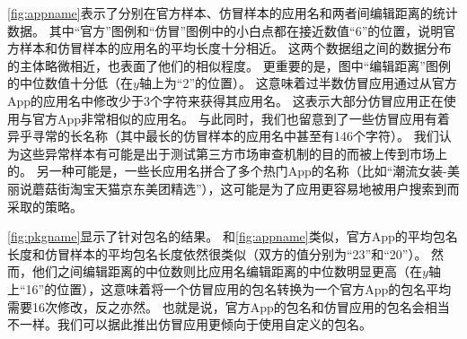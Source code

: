 \autoref{fig:appname}表示了分别在官方样本、仿冒样本的应用名和两者间编辑距离的统计数据。
其中``官方''图例和``仿冒''图例中的小白点都在接近数值``6''的位置，说明官方样本和仿冒样本的应用名的平均长度十分相近。
这两个数据组之间的数据分布的主体略微相近，也表面了他们的相似程度。
更重要的是，图中``编辑距离''图例的中位数值十分低（在$y$轴上为``2''的位置）。
这意味着过半数仿冒应用通过从官方App的应用名中修改少于3个字符来获得其应用名。
这表示大部分仿冒应用正在使用与官方App非常相似的应用名。
与此同时，我们也留意到了一些仿冒应用有着异乎寻常的长名称（其中最长的仿冒样本的应用名中甚至有146个字符）。
我们认为这些异常样本有可能是出于测试第三方市场审查机制的目的而被上传到市场上的。
另一种可能是，一些长应用名拼合了多个热门App的名称（比如``潮流女装-美丽说蘑菇街淘宝天猫京东美团精选''），这可能是为了应用更容易地被用户搜索到而采取的策略。

\autoref{fig:pkgname}显示了针对包名的结果。
和\autoref{fig:appname}类似，官方App的平均包名长度和仿冒样本的平均包名长度依然很类似（双方的值分别为``23''和``20''）。
然而，他们之间编辑距离的中位数则比应用名编辑距离的中位数明显更高（在$y$轴上``16''的位置），这意味着将一个仿冒应用的包名转换为一个官方App的包名平均需要16次修改，反之亦然。
也就是说，官方App的包名和仿冒应用的包名会相当不一样。我们可以据此推出仿冒应用更倾向于使用自定义的包名。

